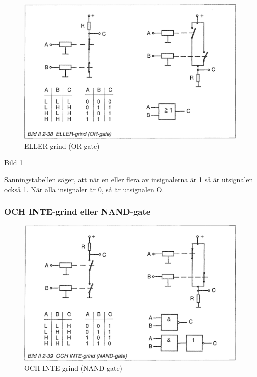 \begin{figure}
\includegraphics[width=\textwidth]{images/bild_2_2-38}
\caption{ELLER-grind (OR-gate)}
\label{fig:BildII2-38}
\end{figure}

Bild \ref{fig:BildII2-38}

Sanningstabellen säger, att när en eller flera av insignalerna är 1 så är
utsignalen också 1. När alla insignaler är 0, så är utsignalen O.

\subsubsection{OCH INTE-grind eller NAND-gate}

\begin{figure}
\includegraphics[width=\textwidth]{images/bild_2_2-39}
\caption{OCH INTE-grind (NAND-gate)}
\label{fig:BildII2-39}
\end{figure}

